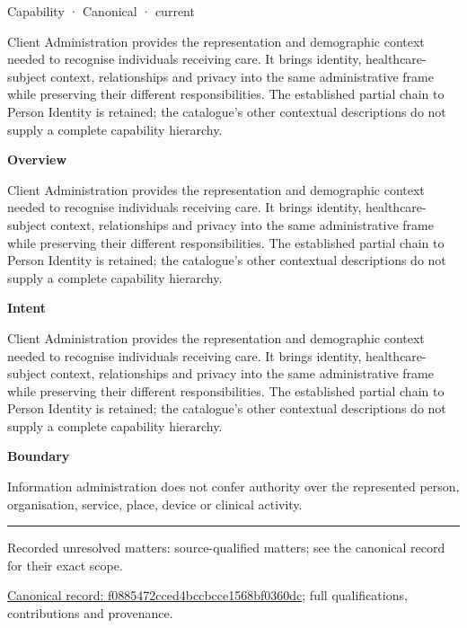 \label{element:f0885472cced4bccbcce1568bf0360dc}
{\small Capability · Canonical · current}\par

Client Administration provides the representation and demographic context needed to recognise individuals receiving care. It brings identity, healthcare-subject context, relationships and privacy into the same administrative frame while preserving their different responsibilities. The established partial chain to Person Identity is retained; the catalogue's other contextual descriptions do not supply a complete capability hierarchy.



\textbf{Overview}



Client Administration provides the representation and demographic context needed to recognise individuals receiving care. It brings identity, healthcare-subject context, relationships and privacy into the same administrative frame while preserving their different responsibilities. The established partial chain to Person Identity is retained; the catalogue's other contextual descriptions do not supply a complete capability hierarchy.



\textbf{Intent}



Client Administration provides the representation and demographic context needed to recognise individuals receiving care. It brings identity, healthcare-subject context, relationships and privacy into the same administrative frame while preserving their different responsibilities. The established partial chain to Person Identity is retained; the catalogue's other contextual descriptions do not supply a complete capability hierarchy.



\textbf{Boundary}



Information administration does not confer authority over the represented person, organisation, service, place, device or clinical activity.



\medskip\hrule\medskip

{\small Recorded unresolved matters: source-qualified matters; see the canonical record for their exact scope.}\par
{\footnotesize \href{../../../../continuum/strategy/capability/f0885472cced4bccbcce1568bf0360dc.md}{Canonical record: f0885472cced4bccbcce1568bf0360dc}; full qualifications, contributions and provenance.}\par
